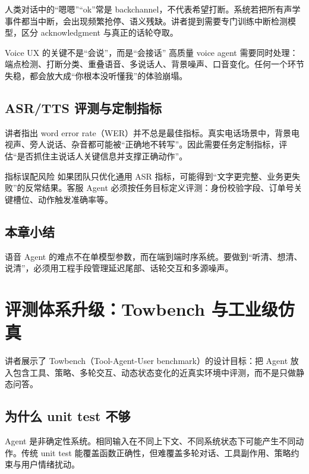 \documentclass[a4paper]{article}
\begin{document}
人类对话中的“嗯嗯”“ok”常是 backchannel，不代表希望打断。系统若把所有声学事件都当中断，会出现频繁抢停、语义残缺。讲者提到需要专门训练中断检测模型，区分 acknowledgment 与真正的话轮夺取。

\begin{importantbox}{Voice UX 的关键不是“会说”，而是“会接话”}
高质量 voice agent 需要同时处理：端点检测、打断分类、重叠语音、多说话人、背景噪声、口音变化。任何一个环节失稳，都会放大成“你根本没听懂我”的体验崩塌。
\end{importantbox}

\subsection{ASR/TTS 评测与定制指标}

讲者指出 word error rate（WER）并不总是最佳指标。真实电话场景中，背景电视声、旁人说话、杂音都可能被“正确地不转写”。因此需要任务定制指标，评估“是否抓住主说话人关键信息并支撑正确动作”。

\begin{warningbox}{指标误配风险}
如果团队只优化通用 ASR 指标，可能得到“文字更完整、业务更失败”的反常结果。客服 Agent 必须按任务目标定义评测：身份校验字段、订单号关键槽位、动作触发准确率等。
\end{warningbox}

\subsection{本章小结}

语音 Agent 的难点不在单模型参数，而在端到端时序系统。要做到“听清、想清、说清”，必须用工程手段管理延迟尾部、话轮交互和多源噪声。

\section{评测体系升级：Towbench 与工业级仿真}

讲者展示了 Towbench（Tool-Agent-User benchmark）的设计目标：把 Agent 放入包含工具、策略、多轮交互、动态状态变化的近真实环境中评测，而不是只做静态问答。

\subsection{为什么 unit test 不够}

Agent 是非确定性系统。相同输入在不同上下文、不同系统状态下可能产生不同动作。传统 unit test 能覆盖函数正确性，但难覆盖多轮对话、工具副作用、策略约束与用户情绪扰动。
\end{document}
